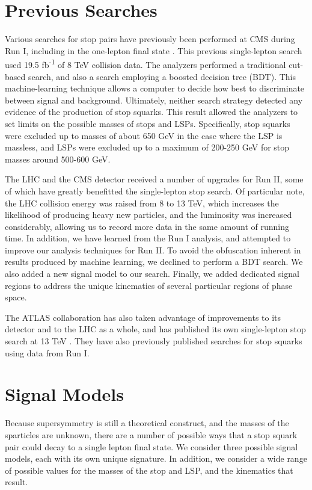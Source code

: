 \section{Previous Searches}
\label{sec:stop:run1}

Various searches for stop pairs have previously been performed at CMS
during Run I, including in the one-lepton final state
\cite{stop1l8tev}. This previous single-lepton search used 19.5
fb\textsuperscript{-1} of 8 TeV collision data. The analyzers performed a traditional
cut-based search, and also a search employing a boosted decision tree
(BDT). This machine-learning technique allows a computer to decide how best
to discriminate between signal and background. Ultimately, neither search
strategy detected any evidence of the production of stop squarks. This
result allowed the analyzers to set limits on the possible masses of
stops and LSPs. Specifically, stop squarks were excluded up to masses
of about 650 GeV in the case where the LSP is massless, and LSPs were
excluded up to a maximum of 200-250 GeV for stop masses around 500-600
GeV.

The LHC and the CMS detector received a number of upgrades for Run II,
some of which have greatly benefitted the single-lepton stop
search. Of particular note, the LHC collision energy was raised from 8
to 13 TeV, which increases the likelihood of producing heavy new
particles, and the luminosity was increased considerably, allowing us %
to record more data in the same amount of running time. In addition,
we have learned from the Run I analysis, and attempted to improve our
analysis techniques for Run II. To avoid the obfuscation inherent in
results produced by machine learning, we declined to perform a BDT
search. We also added a new signal model to our search. Finally, we
added dedicated signal regions to address the unique kinematics of
several particular regions of phase space.

The ATLAS collaboration has also taken advantage of improvements to
its detector and to the LHC as a whole, and has published its own
single-lepton stop search at 13 TeV \cite{stop1latlas13}. They
have also previously published searches for stop squarks using data
from Run I.

\section{Signal Models}
\label{sec:stop:sigmodels}

Because supersymmetry is still a theoretical construct, and the masses
of the sparticles are unknown, there are a number of possible
ways that a stop squark pair could decay to a single lepton final
state. We consider three possible signal models, each with its own
unique signature. In addition, we consider a wide range of possible
values for the masses of the stop and LSP, and the kinematics that result.

